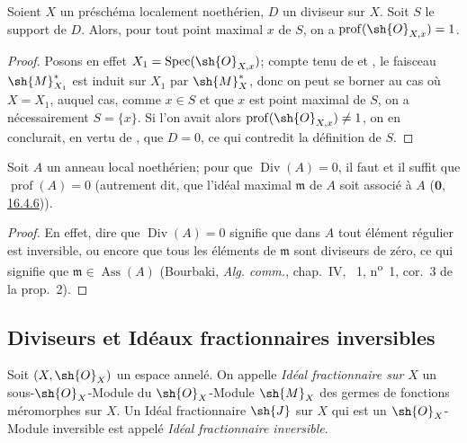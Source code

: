 \begin{corollary}[21.1.9]
\label{IV.21.1.9}
Soient $X$ un préschéma localement noethérien, $D$ un diviseur sur $X$.
Soit $S$ le support de $D$.
Alors, pour tout point maximal $x$ de $S$, on a $\operatorname{prof}(\sh{O}_{X,x})=1$.
\end{corollary}

\begin{proof}
Posons en effet $X_1=\operatorname{Spec}(\sh{O}_{X,x})$;
compte tenu de  et , le faisceau $\sh{M}_{X_1}^*$ est induit sur $X_1$ par $\sh{M}_X^*$, donc on peut se borner au cas où $X=X_1$, auquel cas, comme $x\in S$ et que $x$ est point maximal de $S$, on a nécessairement $S=\{x\}$.
Si l'on avait alors $\operatorname{prof}(\sh{O}_{X,x})\neq1$, on en conclurait, en vertu de , que $D=0$, ce qui contredit la définition de $S$.
\end{proof}

\begin{proposition}[21.1.10]
\label{IV.21.1.10}
Soit $A$ un anneau local noethérien;
pour que $\operatorname{Div}(A)=0$, il faut et il suffit que $\operatorname{prof}(A)=0$ (autrement dit, que l'idéal maximal $\mathfrak{m}$ de $A$ soit associé à $A$ (\hyperref[0.16.4.6]{$\mathbf{0}$, 16.4.6})).
\end{proposition}

\begin{proof}
En effet, dire que $\operatorname{Div}(A)=0$ signifie que dans $A$ tout élément régulier est inversible, ou encore que tous les éléments de $\mathfrak{m}$ sont diviseurs de zéro, ce qui signifie que $\mathfrak{m}\in\operatorname{Ass}(A)$ (Bourbaki, \emph{Alg. comm.}, chap.~IV, \textsection~1, n\textsuperscript{o}~1, cor.~3 de la prop.~2).
\end{proof}

\subsection{Diviseurs et Idéaux fractionnaires inversibles}

\begin{env}[21.2.1]
Soit $(X,\sh{O}_X)$ un espace annelé.
On appelle \emph{Idéal fractionnaire sur $X$} un sous-$\sh{O}_X$-Module du $\sh{O}_X$-Module $\sh{M}_X$ des germes de fonctions méromorphes sur $X$.
Un Idéal fractionnaire $\sh{J}$ sur $X$ qui est un $\sh{O}_X$-Module inversible est appelé \emph{Idéal fractionnaire inversible}.
\end{env}


